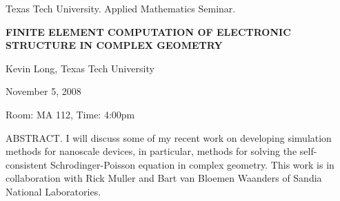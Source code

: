 \documentclass[oneside]{amsart}
\begin{document}
\begin{center}
Texas Tech University. Applied Mathematics Seminar.

\end{center}

\begin{center}

{\LARGE \uppercase{\textbf{
Finite Element Computation of Electronic Structure in Complex Geometry
}}}

Kevin Long, Texas Tech University

November 5, 2008

Room: MA 112, Time: 4:00pm

\end{center}


ABSTRACT.
I will discuss some of my recent work on developing simulation methods for 
nanoscale devices, in particular, methods for solving the self-consistent 
Schrodinger-Poisson equation in complex geometry. This work is in 
collaboration with Rick Muller and Bart van Bloemen Waanders of Sandia 
National Laboratories.
\end{document}
